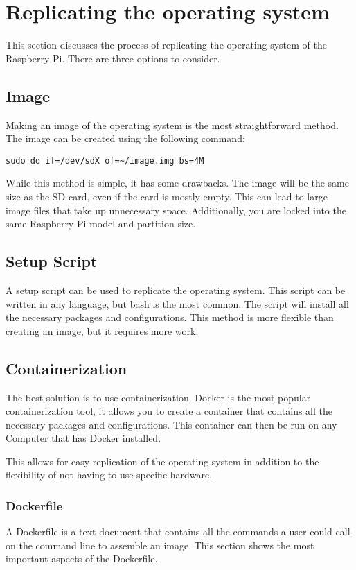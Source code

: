 \section{Replicating the operating system}
This section discusses the process of replicating the
operating system of the Raspberry Pi. There are three options
to consider. 
    \subsection{Image}
    Making an image of the operating system is the most
    straightforward method. The image can be created using
    the following command:
    \begin{verbatim}
sudo dd if=/dev/sdX of=~/image.img bs=4M
    \end{verbatim}
    While this method is simple, it has some drawbacks. The
    image will be the same size as the SD card, even if the
    card is mostly empty. This can lead to large image files
    that take up unnecessary space. Additionally, you are
    locked into the same Raspberry Pi model and partition
    size.

    \subsection{Setup Script}
    A setup script can be used to replicate the operating
    system. This script can be written in any language, but
    bash is the most common. The script will install all the
    necessary packages and configurations. This method is
    more flexible than creating an image, but it requires
    more work.

    \subsection{Containerization}
    The best solution is to use containerization. Docker is
    the most popular containerization tool, it allows
    you to create a container that contains all the necessary
    packages and configurations. This container can then be
    run on any Computer that has Docker installed. \npar

    This allows for easy replication of the operating system in
    addition to the flexibility of not having to use specific
    hardware. 

        \subsubsection{Dockerfile}
        A Dockerfile is a text document that contains all the 
        commands a user could call on the command line to assemble 
        an image. This section shows the most important aspects of the
        Dockerfile. \cite{dockerfile_reference} \npar

